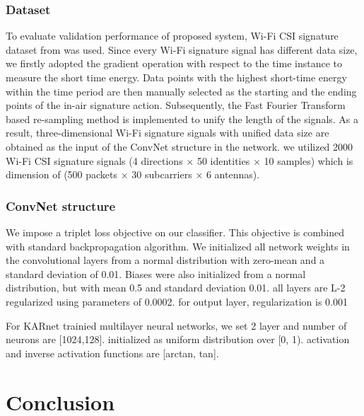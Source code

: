 \documentclass[runningheads]{llncs}
\begin{document}
\subsubsection{Dataset}
 To evaluate validation performance of proposed system, Wi-Fi CSI signature dataset from \cite{moon2017air} was used.
 Since every Wi-Fi signature signal has different data size, we firstly adopted the gradient operation with respect to the time instance to measure the short time energy. Data points with the highest short-time energy within the time period are then manually selected as the starting and the ending points of the in-air signature action. Subsequently, the Fast Fourier Transform based re-sampling method \cite{moon2017air} is implemented to unify the length of the signals. As a result, three-dimensional Wi-Fi signature signals with unified data size are obtained as the input of the ConvNet structure in the network.
 we utilized 2000 Wi-Fi CSI signature signals (4 directions $\times$ 50 identities $\times$ 10 samples) which is dimension of (500 packets $\times$ 30 subcarriers $\times$ 6 antennas). 
 


\subsubsection{ConvNet structure}
 We impose a triplet loss objective on our classifier.
This objective is combined with standard backpropagation algorithm.
 We initialized all network weights in the convolutional layers from a normal distribution with zero-mean and a standard deviation of 0.01. Biases were also initialized from a normal distribution, but with mean 0.5 and standard deviation 0.01.
 all layers are L-2 regularized using parameters of 0.0002. for output layer, regularization is 0.001

 For KARnet trainied multilayer neural networks, we set 2 layer and number of neurons are [1024,128]. initialized as uniform distribution over [0, 1).
 activation and inverse activation functions are [arctan, tan].


\section{Conclusion}

%
%
%
%
%
%






\end{document}
